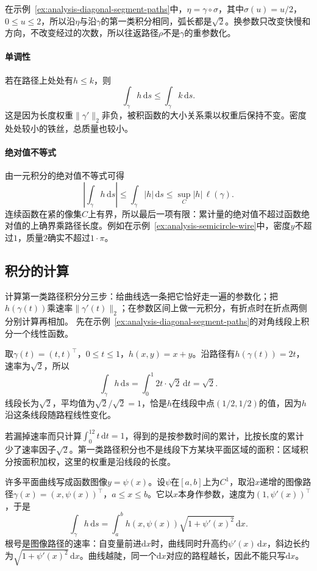 在示例~\ref{ex:analysis-diagonal-segment-paths}中，$\eta=\gamma\circ\sigma$，其中$\sigma(u)=u/2$，$0\leq u\leq2$，所以沿$\eta$与沿$\gamma$的第一类积分相同，弧长都是$\sqrt2$。换参数只改变快慢和方向，不改变经过的次数，所以往返路径$\rho$不是$\gamma$的重参数化。

\paragraph{单调性}

若在路径上处处有$h\leq k$，则
\[
 \int_\gamma h\,\mathrm ds\leq\int_\gamma k\,\mathrm ds.
\]
这是因为长度权重$\lVert\gamma'\rVert_2$非负，被积函数的大小关系乘以权重后保持不变。密度处处较小的铁丝，总质量也较小。

\paragraph{绝对值不等式}

由一元积分的绝对值不等式可得
\[
 \left|\int_\gamma h\,\mathrm ds\right|
 \leq\int_\gamma|h|\,\mathrm ds
 \leq\sup_C|h|\,\ell(\gamma).
\]
连续函数在紧的像集$C$上有界，所以最后一项有限：累计量的绝对值不超过函数绝对值的上确界乘路径长度。例如在示例~\ref{ex:analysis-semicircle-wire}中，密度$y$不超过$1$，质量$2$确实不超过$1\cdot\pi$。

\subsection{积分的计算}

计算第一类路径积分分三步：给曲线选一条把它恰好走一遍的参数化；把$h(\gamma(t))$乘速率$\lVert\gamma'(t)\rVert_2$；在参数区间上做一元积分，有折点时在折点两侧分别计算再相加。
先在示例~\ref{ex:analysis-diagonal-segment-paths}的对角线段上积分一个线性函数。
\begin{example}[沿对角线段积分$x+y$]
取$\gamma(t)=(t,t)^\top$，$0\leq t\leq1$，$h(x,y)=x+y$。沿路径有$h(\gamma(t))=2t$，速率为$\sqrt2$，所以
\[
 \int_\gamma h\,\mathrm ds=\int_0^1 2t\cdot\sqrt2\,\mathrm dt=\sqrt2.
\]
线段长为$\sqrt2$，平均值为$\sqrt2/\sqrt2=1$，恰是$h$在线段中点$(1/2,1/2)$的值，因为$h$沿这条线段随路程线性变化。
\end{example}
若漏掉速率而只计算$\int_0^12t\,\mathrm dt=1$，得到的是按参数时间的累计，比按长度的累计少了速率因子$\sqrt2$。第一类路径积分也不是线段下方某块平面区域的面积：区域积分按面积加权，这里的权重是沿线段的长度。

许多平面曲线写成函数图像$y=\psi(x)$。设$\psi$在$[a,b]$上为$C^1$，取沿$x$递增的图像路径$\gamma(x)=(x,\psi(x))^\top$，$a\leq x\leq b$。它以$x$本身作参数，速度为$(1,\psi'(x))^\top$，于是
\[
 \int_\gamma h\,\mathrm ds
 =\int_a^b h(x,\psi(x))\sqrt{1+\psi'(x)^2}\,\mathrm dx.
\]
根号是图像路径的速率：自变量前进$\mathrm dx$时，曲线同时升高约$\psi'(x)\,\mathrm dx$，斜边长约为$\sqrt{1+\psi'(x)^2}\,\mathrm dx$。曲线越陡，同一个$\mathrm dx$对应的路程越长，因此不能只写$\mathrm dx$。

